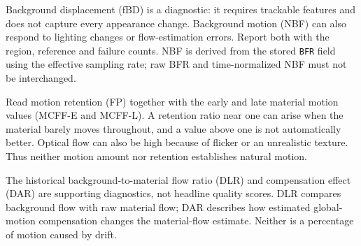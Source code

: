 Background displacement (fBD) is a diagnostic: it requires trackable features and does not capture every appearance change. Background motion (NBF) can also respond to lighting changes or flow-estimation errors. Report both with the region, reference and failure counts. NBF is derived from the stored \texttt{BFR} field using the effective sampling rate; raw BFR and time-normalized NBF must not be interchanged.

Read motion retention (FP) together with the early and late material motion values (MCFF-E and MCFF-L). A retention ratio near one can arise when the material barely moves throughout, and a value above one is not automatically better. Optical flow can also be high because of flicker or an unrealistic texture. Thus neither motion amount nor retention establishes natural motion.

The historical background-to-material flow ratio (DLR) and compensation effect (DAR) are supporting diagnostics, not headline quality scores. DLR compares background flow with raw material flow; DAR describes how estimated global-motion compensation changes the material-flow estimate. Neither is a percentage of motion caused by drift.

